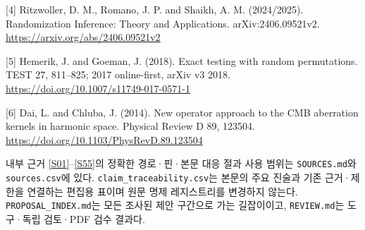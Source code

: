 \documentclass[11pt,a4paper]{article}
\begin{document}
[4] Ritzwoller, D. M., Romano, J. P. and Shaikh, A. M. (2024/2025). Randomization Inference: Theory and Applications. arXiv:2406.09521v2. \url{https://arxiv.org/abs/2406.09521v2}


[5] Hemerik, J. and Goeman, J. (2018). Exact testing with random permutations. TEST 27, 811–825; 2017 online-first, arXiv v3 2018. \url{https://doi.org/10.1007/s11749-017-0571-1}


[6] Dai, L. and Chluba, J. (2014). New operator approach to the CMB aberration kernels in harmonic space. Physical Review D 89, 123504. \url{https://doi.org/10.1103/PhysRevD.89.123504}


내부 근거 \hyperlink{src:S01}{[S01]}–\hyperlink{src:S55}{[S55]}의 정확한 경로·핀·본문 대응 절과 사용 범위는 \texttt{SOURCES.md}와 \texttt{sources.csv}에 있다. \texttt{claim\_traceability.csv}는 본문의 주요 진술과 기존 근거·제한을 연결하는 편집용 표이며 원문 명제 레지스트리를 변경하지 않는다. \texttt{PROPOSAL\_INDEX.md}는 모든 조사된 제안 구간으로 가는 길잡이이고, \texttt{REVIEW.md}는 도구·독립 검토·PDF 검수 결과다.
\end{document}
